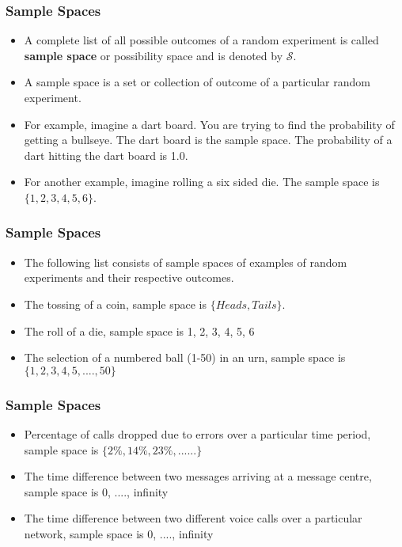 \documentclass[IntroMain.tex]{subfiles}
\begin{document}
\begin{frame}
	\frametitle{Sample Spaces}
	
	\begin{itemize}
	\item	A complete list of all possible outcomes of a random experiment is called \textbf{sample space }or possibility space and is denoted by $\mathcal{S}$.
		
		
	\item	A sample space is a set or collection of outcome of a particular random experiment.
		
	\item 	For example, imagine a dart board. You are trying to find the probability of getting a bullseye. The dart board is the sample space. The probability of a dart hitting the dart board is 1.0.
	\item For another example, imagine rolling a six sided die. The sample space is $\{1, 2, 3, 4, 5, 6\}$.
	\end{itemize}

	
\end{frame}
\begin{frame}
	\frametitle{Sample Spaces}
	\Large
	\begin{itemize}
\item	The following list consists of sample spaces of examples of random experiments and their respective outcomes.
	
\item	The tossing of a coin, sample space is $\{Heads, Tails\}$.
	
\item 	The roll of a die, sample space is {1, 2, 3, 4, 5, 6}
	
\item The selection of a numbered ball (1-50) in an urn, sample space is $\{1, 2, 3, 4, 5, ...., 50\}$
	\end{itemize}
	
	
\end{frame}

\begin{frame}
	\frametitle{Sample Spaces}
	\Large
	\begin{itemize}
	\item Percentage of calls dropped due to errors over a particular time period, sample space is $\{2\%, 14\%, 23\%, ......\}$
	
	\item The time difference between two messages arriving at a message centre, sample space is {0, ...., infinity}
	
	\item The time difference between two different voice calls over a particular network, sample space is {0, ...., infinity}
	\end{itemize}

		
	\end{frame}



\end{document}
